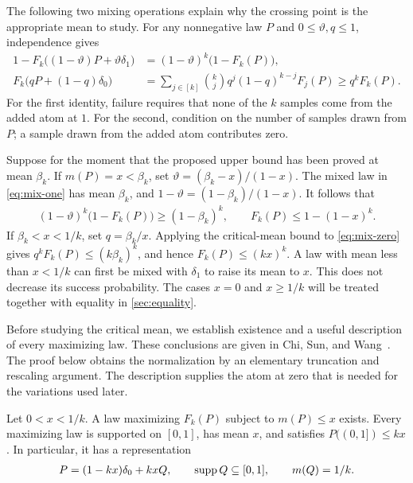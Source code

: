 The following two mixing operations explain why the crossing point is the appropriate mean to study. For any nonnegative law $P$ and $0\le\vartheta,q\le1$, independence gives
\begin{align}
 1-F_k\bigl((1-\vartheta)P+\vartheta\delta_1\bigr)
   &=(1-\vartheta)^k\bigl(1-F_k(P)\bigr),\label{eq:mix-one}\\
 F_k\bigl(qP+(1-q)\delta_0\bigr)
   &=\sum_{j\in[k]}\binom kj q^j(1-q)^{k-j}F_j(P)
     \ge q^kF_k(P).\label{eq:mix-zero}
\end{align}
For the first identity, failure requires that none of the $k$ samples come from the added atom at $1$. For the second, condition on the number of samples drawn from $P$; a sample drawn from the added atom contributes zero.

Suppose for the moment that the proposed upper bound has been proved at mean $\beta_k$. If $m(P)=x<\beta_k$, set $\vartheta=(\beta_k-x)/(1-x)$. The mixed law in \cref{eq:mix-one} has mean $\beta_k$, and $1-\vartheta=(1-\beta_k)/(1-x)$. It follows that
\begin{align*}
 (1-\vartheta)^k\bigl(1-F_k(P)\bigr)\ge(1-\beta_k)^k,
 \qquad F_k(P)\le1-(1-x)^k.
\end{align*}
If $\beta_k<x<1/k$, set $q=\beta_k/x$. Applying the critical-mean bound to \cref{eq:mix-zero} gives $q^kF_k(P)\le(k\beta_k)^k$, and hence $F_k(P)\le(kx)^k$. A law with mean less than $x<1/k$ can first be mixed with $\delta_1$ to raise its mean to $x$. This does not decrease its success probability. The cases $x=0$ and $x\ge1/k$ will be treated together with equality in \cref{sec:equality}.

Before studying the critical mean, we establish existence and a useful description of every maximizing law. These conclusions are given in Chi, Sun, and Wang~\cite[Lemma 2.7 and Proposition 2.10]{CSW2026}. The proof below obtains the normalization by an elementary truncation and rescaling argument. The description supplies the atom at zero that is needed for the variations used later.

\begin{lemma}\label{lem:normalization}
Let $0<x<1/k$. A law maximizing $F_k(P)$ subject to $m(P)\le x$ exists. Every maximizing law is supported on $[0,1]$, has mean $x$, and satisfies $P((0,1])\le kx$. In particular, it has a representation
\begin{align}\label{eq:normalized-law}
 P=(1-kx)\delta_0+kxQ,
 \qquad \operatorname{supp} Q\subseteq[0,1],
 \qquad m(Q)=1/k.
\end{align}
\end{lemma}

